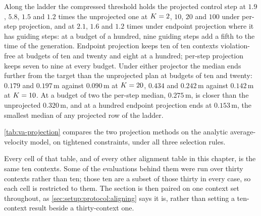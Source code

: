 
Along the ladder the compressed threshold holds the projected control step at $1.9$, $5.8$, $1.5$ and
$1.2$ times the unprojected one at $K=2$, $10$, $20$ and $100$ under per-step projection, and at $2.1$,
$1.6$ and $1.2$ times under endpoint projection where it has guiding steps: at a budget of a hundred,
nine guiding steps add a fifth to the time of the generation. Endpoint projection keeps ten of ten contexts
violation-free at budgets of ten and twenty and eight at a hundred; per-step projection keeps seven to nine at
every budget. Under either projector the median ends further from the target than the unprojected plan at
budgets of ten and twenty: $0.179$ and $0.197$\,m against $0.090$\,m at $K=20$, $0.434$ and $0.242$\,m
against $0.142$\,m at $K=10$. At a budget of two the per-step median, $0.275$\,m, is closer than the
unprojected $0.320$\,m, and at a hundred endpoint projection ends at $0.153$\,m, the smallest median of any
projected row of the ladder.


\autoref{tab:va-projection} compares the two projection methods on the analytic average-velocity model,
on tightened constraints, under all three selection rules.

Every cell of that table, and of every other alignment table in this chapter, is the same ten contexts.
Some of the evaluations behind them were run over thirty contexts rather than ten; those ten are a subset
of those thirty in every case, so each cell is restricted to them. The section is then paired on one
context set throughout, as \autoref{sec:setup:protocol:aligning} says it is, rather than setting a
ten-context result beside a thirty-context one.

